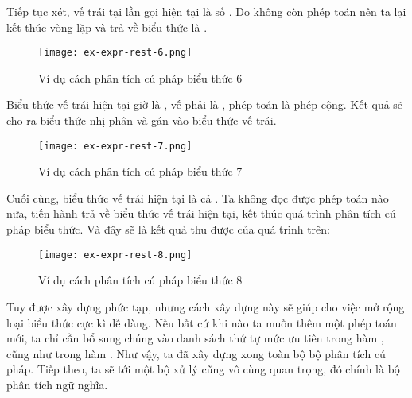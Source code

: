     Tiếp tục xét, vế trái tại lần gọi hiện tại là số . Do không còn phép toán nên ta lại kết thúc vòng lặp và trả về biểu thức là . 

\begin{figure}[H]
    \centering
    \texttt{[image: ex-expr-rest-6.png]}
    \caption{Ví dụ cách phân tích cú pháp biểu thức 6}
\end{figure}

    Biểu thức vế trái hiện tại giờ là , vế phải là , phép toán là phép cộng. Kết quả sẽ cho ra biểu thức nhị phân  và gán vào biểu thức vế trái.

\begin{figure}[H]
    \centering
    \texttt{[image: ex-expr-rest-7.png]}
    \caption{Ví dụ cách phân tích cú pháp biểu thức 7}
\end{figure}

    Cuối cùng, biểu thức vế trái hiện tại là cả . Ta không đọc được phép toán nào nữa, tiến hành trả về biểu thức vế trái hiện tại, kết thúc quá trình phân tích cú pháp biểu thức. Và đây sẽ là kết quả thu được của quá trình trên:

\begin{figure}[H]
    \centering
    \texttt{[image: ex-expr-rest-8.png]}
    \caption{Ví dụ cách phân tích cú pháp biểu thức 8}
\end{figure}

    Tuy được xây dựng phức tạp, nhưng cách xây dựng này sẽ giúp cho việc mở rộng loại biểu thức cực kì dễ dàng. Nếu bất cứ khi nào ta muốn thêm một phép toán mới, ta chỉ cần bổ sung chúng vào danh sách thứ tự mức ưu tiên trong hàm , cũng như trong hàm . Như vậy, ta đã xây dựng xong toàn bộ bộ phân tích cú pháp. Tiếp theo, ta sẽ tới một bộ xử lý cũng vô cùng quan trọng, đó chính là bộ phân tích ngữ nghĩa.
